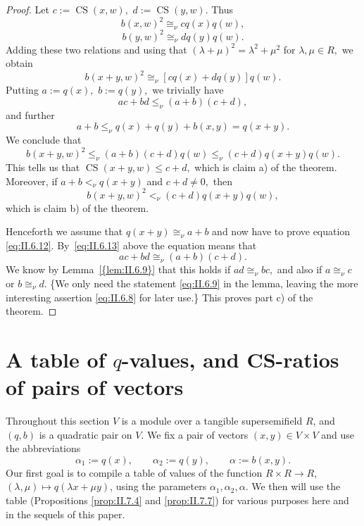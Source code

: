 \documentclass [12pt,a4paper,reqno]{amsart}
\begin{document}
\begin{proof}
 Let $c:={\operatorname{CS}}(x,w),$ $d:={\operatorname{CS}}(y,w).$ Thus
$$b(x,w)^2\cong_\nu cq(x)q(w),$$
$$b(y,w)^2\cong_\nu dq(y)q(w).$$
 Adding these two relations and using that
$({\lambda}+\mu)^2={\lambda}^2+\mu^2$ for ${\lambda},\mu\in R,$ we obtain
\begin{equation}\label{eq:II.6.13}
b(x+y,w)^2\cong_\nu[cq(x)+dq(y)]q(w).\end{equation} Putting
$a:=q(x),$ $b:=q(y),$ we trivially have
$$ac+bd\le_\nu(a+b)(c+d),$$
and further
$$a+b\le_\nu q(x)+q(y)+b(x,y)=q(x+y).$$
We conclude that
$$b(x+y,w)^2\le_\nu (a+b)(c+d)q(w)\le_\nu(c+d)q(x+y)q(w).$$
This tells us that ${\operatorname{CS}}(x+y,w)\le c+d,$  which is claim a) of the
theorem. Moreover, if $a+b<_\nu q(x+y)$ and $c+d\ne0,$ then
$$b(x+y,w)^2<_\nu (c+d)q(x+y)q(w),$$
which is claim b) of the theorem.

Henceforth we assume that $q(x+y)\cong_\nu a+b$ and now have to
prove equation \eqref{eq:II.6.12}. By~\eqref{eq:II.6.13} above the equation
means that
$$ac+bd\cong_\nu (a+b)(c+d).$$
We know by {Lemma~\ref{{lem:II.6.9}}} that this holds if $ad\cong_\nu bc,$
and also if $a\cong_\nu c$ or $b\cong_\nu d.$ \{We only need the
statement \eqref{eq:II.6.9} in the lemma, leaving the more
interesting assertion \eqref{eq:II.6.8} for later use.\} This proves part c) of
the theorem.\end{proof}

\section{A table of $q$-values, and CS-ratios of pairs of vectors}\label{sec:II.7}

Throughout this  section $V$ is a module over a tangible supersemifield $R$, and $(q,b)$ is a quadratic pair on $V$. We fix a pair of vectors $(x,y) \in V \times V$ and use the abbreviations
\begin{equation}\label{eq:II.7.1}
{\alpha}_1 := q(x), \qquad {\alpha}_2 := q(y), \qquad {\alpha} := b(x,y).
\end{equation}
Our first goal is to compile a table of values of the function $R \times R \to R$, $({\lambda},\mu) \mapsto q({\lambda} x + \mu y)$, using the parameters ${\alpha}_1, {\alpha}_2, {\alpha}.$ We then will use the table  (Propositions \ref{prop:II.7.4} and \ref{prop:II.7.7}) for various purposes here and in the sequels of this paper.
\end{document}
